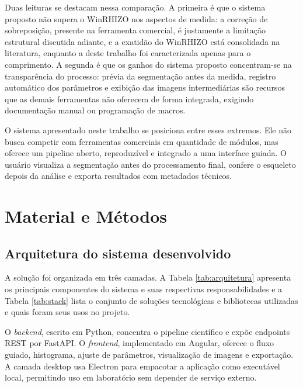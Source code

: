\documentclass[12pt]{article}
\begin{document}
Duas leituras se destacam nessa comparação. A primeira é que o sistema proposto não supera o WinRHIZO nos aspectos de medida: a correção de sobreposição, presente na ferramenta comercial, é justamente a limitação estrutural discutida adiante, e a exatidão do WinRHIZO está consolidada na literatura, enquanto a deste trabalho foi caracterizada apenas para o comprimento. A segunda é que os ganhos do sistema proposto concentram-se na transparência do processo: prévia da segmentação antes da medida, registro automático dos parâmetros e exibição das imagens intermediárias são recursos que as demais ferramentas não oferecem de forma integrada, exigindo documentação manual ou programação de macros.

O sistema apresentado neste trabalho se posiciona entre esses extremos. Ele não busca competir com ferramentas comerciais em quantidade de módulos, mas oferece um pipeline aberto, reproduzível e integrado a uma interface guiada. O usuário visualiza a segmentação antes do processamento final, confere o esqueleto depois da análise e exporta resultados com metadados técnicos.

\section{Material e Métodos}

\subsection{Arquitetura do sistema desenvolvido}

A solução foi organizada em três camadas. A Tabela \ref{tab:arquitetura} apresenta os principais componentes do sistema e suas respectivas responsabilidades e a Tabela \ref{tab:stack} lista o conjunto de soluções tecnológicas e bibliotecas utilizadas e quais foram seus usos no projeto. 

O \textit{backend}, escrito em Python, concentra o pipeline científico e expõe endpoints REST por FastAPI. O \textit{frontend}, implementado em Angular, oferece o fluxo guiado, histograma, ajuste de parâmetros, visualização de imagens e exportação. A camada desktop usa Electron para empacotar a aplicação como executável local, permitindo uso em laboratório sem depender de serviço externo.
\vspace{5mm}
\end{document}
